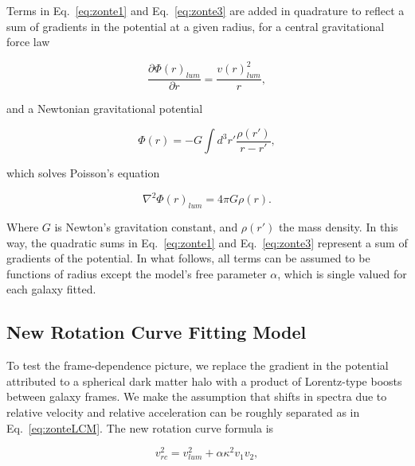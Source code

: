 \documentclass[reprint,%
 amsmath,amssymb,
 aps,
]{revtex4-1}
\begin{document}
  Terms in  Eq.~\ref{eq:zonte1} and Eq.~\ref{eq:zonte3} are added in quadrature to reflect a   sum of gradients in the potential at a given radius, 
 for a central gravitational    force law   

\begin{equation}
 \frac{\partial \Phi(r)_{lum}}{\partial r}    =\frac{v(r)_{lum}^2}{r},  
    \label{zoochance1}
\end{equation}

  
   
and a  Newtonian gravitational potential 

\begin{equation}
      \Phi(r)  = -G \int d^3r'  \frac{ \rho(r') }{r-r'} ,
      \label{eq:Newt}
      \end{equation}

which solves Poisson's equation

\begin{equation}
\nabla^2 \Phi(r)_{lum}  = 4\pi G \rho(r).   
    \label{whatsgood}
\end{equation}

 Where $G$ is Newton's   gravitation constant, and 
$\rho(r')$  the mass density. 
 In this way, the  quadratic sums in  Eq.~\ref{eq:zonte1} and Eq.~\ref{eq:zonte3} represent a sum of gradients of the potential.    In what follows, all   terms  can be assumed to  be functions of radius except the model's free parameter $\alpha$,  which is single valued for each galaxy fitted. 



\subsection{New Rotation Curve Fitting Model}

 

 

 To test the   
frame-dependence picture, 
we  replace the gradient in the potential attributed to  a spherical dark matter halo    with a product of  Lorentz-type boosts between galaxy frames.   We make the   assumption that shifts in   spectra   due to relative velocity and relative acceleration  can be roughly  separated \cite{Jack,Cisn} as in Eq.~\ref{eq:zonteLCM}. The new rotation curve formula is
   

\begin{equation}
v_{rc}^2 =  v_{lum}^2+\alpha \kappa^2 v_{1} v_{2},  
\label{eq:zonteLCM}
\end{equation}  
\end{document}
